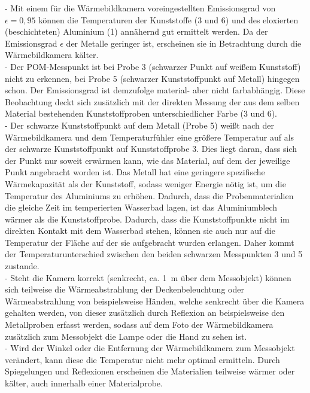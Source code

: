 - Mit einem für die Wärmebildkamera voreingestellten Emissionsgrad von $\epsilon=0,95$ können die Temperaturen der  Kunststoffe (3 und 6) und des eloxierten (beschichteten) Aluminium (1) annähernd gut ermittelt werden. Da der Emissionsgrad $\epsilon$ der Metalle geringer ist, erscheinen sie in Betrachtung durch die  Wärmebildkamera kälter. \\
- Der POM-Messpunkt ist bei Probe 3 (schwarzer Punkt auf weißem Kunststoff) nicht zu erkennen, bei Probe 5 (schwarzer Kunststoffpunkt auf Metall) hingegen schon. Der Emissionsgrad ist demzufolge material- aber nicht farbabhängig. Diese Beobachtung deckt sich zusätzlich mit der direkten Messung der aus dem selben Material bestehenden Kunststoffproben unterschiedlicher Farbe (3 und 6). \\
- Der schwarze Kunststoffpunkt auf dem Metall (Probe 5) weißt nach der Wärmebildkamera und dem Temperaturfühler eine größere Temperatur auf als der schwarze Kunststoffpunkt auf Kunststoffprobe 3. Dies liegt daran, dass sich der Punkt nur soweit erwärmen kann, wie das Material, auf dem der jeweilige Punkt angebracht worden ist. Das Metall hat eine geringere spezifische Wärmekapazität als der Kunststoff, sodass weniger Energie nötig ist, um die Temperatur des Aluminiums zu erhöhen. Dadurch, dass die Probenmaterialien die gleiche Zeit im temperierten Wasserbad lagen, ist das Aluminiumblech wärmer als die Kunststoffprobe. Dadurch, dass die Kunststoffpunkte nicht im direkten Kontakt mit dem Wasserbad stehen, können sie auch nur auf die Temperatur der Fläche auf der sie aufgebracht wurden erlangen. Daher kommt der Temperaturunterschied zwischen den beiden schwarzen Messpunkten 3 und 5 zustande.\\ 
-  Steht die Kamera korrekt (senkrecht, ca. \SI{1}{m} über dem Messobjekt) können sich teilweise die Wärmeabstrahlung der Deckenbeleuchtung oder Wärmeabstrahlung von beispielsweise Händen, welche senkrecht über die Kamera gehalten werden, von dieser zusätzlich durch Reflexion an beispielsweise den Metallproben erfasst werden, sodass auf dem Foto der Wärmebildkamera zusätzlich zum Messobjekt die Lampe oder die Hand zu sehen ist. \\
- Wird der Winkel oder die Entfernung der Wärmebildkamera zum Messobjekt verändert, kann diese die Temperatur nicht mehr optimal ermitteln. Durch Spiegelungen und Reflexionen erscheinen die Materialien teilweise wärmer oder kälter, auch innerhalb einer Materialprobe. 


